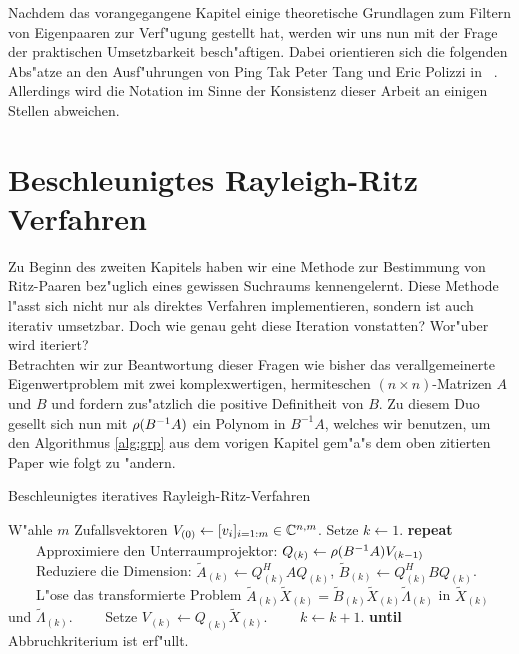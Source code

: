Nachdem das vorangegangene Kapitel einige theoretische Grundlagen zum Filtern von Eigenpaaren zur Verf"ugung gestellt hat, werden wir uns nun mit der Frage der praktischen Umsetzbarkeit besch"aftigen.
Dabei orientieren sich die folgenden Abs"atze
an den Ausf"uhrungen
von Ping Tak Peter Tang und Eric Polizzi in ~\cite{ptep}. Allerdings wird
die Notation im Sinne der Konsistenz dieser Arbeit an einigen Stellen abweichen.

\section{Beschleunigtes Rayleigh-Ritz Verfahren}\label{chap3:beschrr}

Zu Beginn des zweiten Kapitels haben wir eine Methode zur Bestimmung von Ritz-Paaren bez"uglich eines gewissen Suchraums kennengelernt.
Diese Methode l"asst sich nicht nur als direktes Verfahren implementieren, sondern ist auch iterativ umsetzbar. Doch wie genau geht diese Iteration vonstatten? Wor"uber wird iteriert?\\

Betrachten wir zur Beantwortung dieser Fragen wie bisher das verallgemeinerte Eigenwertproblem mit zwei
komplexwertigen, hermiteschen $(n\times n)$-Matrizen $A$ und $B$ und fordern
zus"atzlich die positive Definitheit von $B$. Zu diesem Duo gesellt sich nun
mit $\rho(B^{-1}A)$ ein Polynom in $B^{-1}A$, welches wir benutzen, um den Algorithmus \ref{alg:grp} aus dem vorigen Kapitel gem"a"s dem
oben zitierten Paper wie folgt zu "andern.

\begin{algorithm}\label{alg:beschlrr}
\caption{Beschleunigtes iteratives Rayleigh-Ritz-Verfahren}\label{euclid}
\begin{algorithmic}[1]
\State W"ahle $m$ Zufallsvektoren $V_{(0)} \gets [v_i]_{i=1:m} \in\mathbb{C}^{n,m}$.
Setze $k \gets 1$.
\State \textbf{repeat}
\State \ \ \ \ Approximiere den Unterraumprojektor: $Q_{(k)} \gets \rho(B^{-1}A)V_{(k-1)}$
\State \ \ \ \ Reduziere die Dimension: $\widetilde{A}_{(k)} \gets Q_{(k)}^H A Q_{(k)}$,
$\widetilde{B}_{(k)} \gets Q_{(k)}^H B Q_{(k)}$.
\State \ \ \ \ L"ose das transformierte Problem $\widetilde{A}_{(k)}\widetilde{X}_{(k)}
= \widetilde{B}_{(k)}\widetilde{X}_{(k)}\widetilde{\Lambda}_{(k)}$ in
$\widetilde{X}_{(k)}$ und $\widetilde{\Lambda}_{(k)}$.
\State \ \ \ \ Setze $V_{(k)} \gets Q_{(k)}\widetilde{X}_{(k)}$.
\State \ \ \ \ $k \gets k+1$.
\State \textbf{until} Abbruchkriterium ist erf"ullt.
\end{algorithmic}
\end{algorithm}

